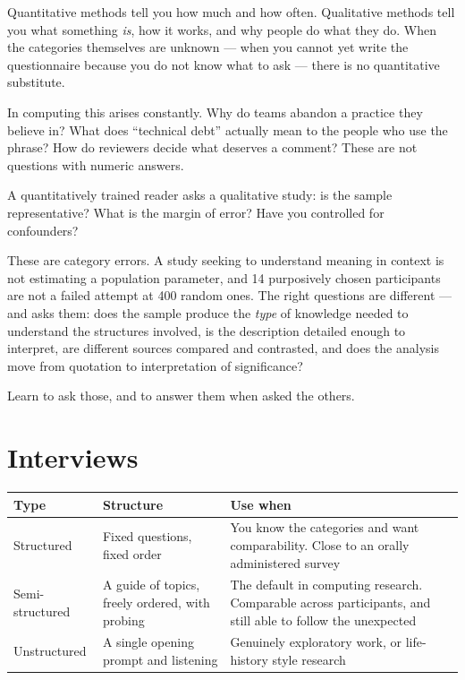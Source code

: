 Quantitative methods tell you how much and how often. Qualitative methods tell
you what something \emph{is}, how it works, and why people do what they do.
When the categories themselves are unknown --- when you cannot yet write the
questionnaire because you do not know what to ask --- there is no quantitative
substitute.

In computing this arises constantly. Why do teams abandon a practice they
believe in? What does ``technical debt'' actually mean to the people who use
the phrase? How do reviewers decide what deserves a comment? These are not
questions with numeric answers.

\begin{alertbox}
A quantitatively trained reader asks a qualitative study: is the sample
representative? What is the margin of error? Have you controlled for
confounders?

\medskip
These are category errors. A study seeking to understand meaning in context is
not estimating a population parameter, and 14 purposively chosen participants
are not a failed attempt at 400 random ones. The right questions are different
--- and  asks them: does the sample produce the
\emph{type} of knowledge needed to understand the structures involved, is the
description detailed enough to interpret, are different sources compared and
contrasted, and does the analysis move from quotation to interpretation of
significance?

\medskip
Learn to ask those, and to answer them when asked the others.
\end{alertbox}

\section{Interviews}

\begin{center}
\small
\begin{tabular}{@{}L{2.8cm}L{4.6cm}L{6.9cm}@{}}
\toprule
\textbf{Type} & \textbf{Structure} & \textbf{Use when} \\
\midrule
Structured    & Fixed questions, fixed order
              & You know the categories and want comparability. Close to an
                orally administered survey \\
Semi-structured & A guide of topics, freely ordered, with probing
              & The default in computing research. Comparable across
                participants, and still able to follow the unexpected \\
Unstructured  & A single opening prompt and listening
              & Genuinely exploratory work, or life-history style research \\
\bottomrule
\end{tabular}
\end{center}

